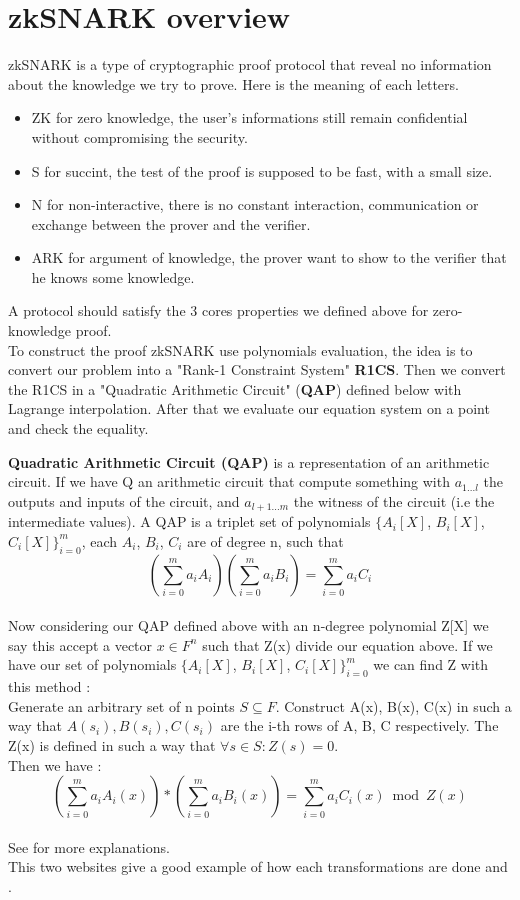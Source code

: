 \section{zkSNARK overview}
zkSNARK is a type of cryptographic proof protocol that reveal no information about the knowledge we try to prove. Here is the meaning of each letters.
\begin{itemize}
    \item ZK for zero knowledge, the user's informations still remain confidential without compromising the security.
    \item S for succint, the test of the proof is supposed to be fast, with a small size.
    \item N for non-interactive, there is no constant interaction, communication or exchange between the prover and the verifier. 
    \item ARK for argument of knowledge, the prover want to show to the verifier that he knows some knowledge.
\end{itemize}
A protocol should satisfy the 3 cores properties we defined above for zero-knowledge proof. \\

To construct the proof zkSNARK use polynomials evaluation, the idea is to convert our problem into a "Rank-1 Constraint System" \textbf{R1CS}. Then we convert the R1CS in a "Quadratic Arithmetic Circuit" (\textbf{QAP}) defined below with Lagrange interpolation. After that we evaluate our equation system on a point and check the equality. 

\textbf{Quadratic Arithmetic Circuit (QAP)} is a representation of an arithmetic circuit. 
If we have Q an arithmetic circuit that compute something with $a_{1...l}$ the outputs and inputs of the circuit, and  $a_{l+1...m}$ the witness of the circuit (i.e the intermediate values). 
A QAP is a triplet set of polynomials $\{A_i[X]$, $B_i[X]$, $C_i[X]\}_{i=0}^m$, each $A_i$, $B_i$, $C_i$ are of degree n, such that \[ (\sum_{i=0}^m a_i A_i) (\sum_{i=0}^m a_i B_i) = \sum_{i=0}^m a_i C_i  \] 
\\ Now considering our QAP defined above with an n-degree polynomial Z[X] we say this accept a vector $x \in F^n$ such that Z(x) divide our equation above. If we have our set of polynomials $\{A_i[X]$, $B_i[X]$, $C_i[X]\}_{i=0}^m$ we can find Z with this method : 
\\ Generate an arbitrary set of n points $S \subseteq F$. Construct A(x), B(x), C(x) in such a way that $A(s_i ), B(s_i ), C(s_i )$ are the i-th rows of A, B, C respectively. The Z(x) is defined in such a way that
$\forall s \in S : Z(s) = 0$.
\\ Then we have : \[ (\sum_{i=0}^m a_i A_i(x)) * (\sum_{i=0}^m a_i B_i(x)) = \sum_{i=0}^m a_i C_i(x) \bmod Z(x) \] 
\\ See \cite{Succinct_Non_Interactive_Arguments_from_Quadratic_Arithmetic_Programs} for more explanations. \\
This two websites give a good example of how each transformations are done \cite{QAP_creation} and \cite{QAP_creation_2}.